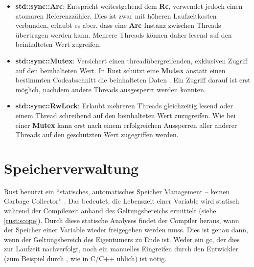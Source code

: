 \begin{itemize}
	\item \textbf{std::sync::Arc}: Entspricht weitestgehend dem \textbf{Rc}, verwendet jedoch einen atomaren Referenzzähler.
	Dies ist zwar mit höheren Laufzeitkosten verbunden, erlaubt es aber, dass eine \textbf{Arc} Instanz zwischen Threads übertragen werden kann.
	Mehrere Threads können daher lesend auf den beinhalteten Wert zugreifen.
	
	\item \textbf{std::sync::Mutex}: Versichert einen threadübergreifenden, exklusiven Zugriff auf den beinhalteten Wert.
	In Rust schützt eine \textbf{Mutex} anstatt einen bestimmten Codeabschnitt die beinhalteten Daten \cite[486]{rust:orly_programming}.
	Ein Zugriff darauf ist erst möglich, nachdem andere Threads ausgesperrt werden konnten.
	
	\item \textbf{std::sync::RwLock}: Erlaubt mehreren Threads gleichzeitig lesend oder einem Thread schreibend auf den beinhalteten Wert zuzugreifen. Wie bei einer \textbf{Mutex} kann erst nach einem erfolgreichen Aussperren aller anderer Threads auf den geschützten Wert zugegriffen werden.
	
	
\end{itemize}


\section{Speicherverwaltung}
\label{rust:scope}
\label{rust:static_analysis}

Rust benutzt ein \enquote{statisches, automatisches Speicher Management -- keinen Garbage Collector} \cite{rust:youtube:goto2017}.
Das bedeutet, die Lebenszeit einer Variable wird statisch während der Compilezeit anhand des Geltungsbereichs ermittelt (siehe \autoref{rust:scope}).
Durch diese statische Analyses findet der Compiler heraus, wann der Speicher einer Variable wieder freigegeben werden muss.
Dies ist genau dann, wenn der Geltungsbereich des Eigentümers zu Ende ist.
Weder ein \gls{gc}, der dies zur Laufzeit nachverfolgt, noch ein manuelles Eingreifen durch den Entwickler (zum Beispiel durch , wie in C/C++ üblich) ist nötig.

